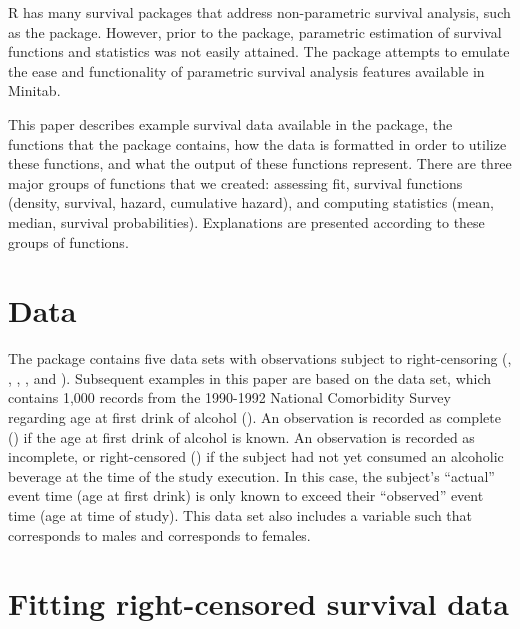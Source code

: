 R has many survival packages that address non-parametric survival
analysis, such as the  package. However, prior to the
 package, parametric estimation of survival functions
and statistics was not easily attained. The  package
attempts to emulate the ease and functionality of parametric survival
analysis features available in Minitab.

This paper describes example survival data available in the
 package, the functions that the package contains, how
the data is formatted in order to utilize these functions, and what the
output of these functions represent. There are three major groups of
functions that we created: assessing fit, survival functions (density,
survival, hazard, cumulative hazard), and computing statistics (mean,
median, survival probabilities). Explanations are presented according to
these groups of functions.

\hypertarget{data}{%
\section{Data}\label{data}}

The  package contains five data sets with observations
subject to right-censoring (, ,
, , and ). Subsequent
examples in this paper are based on the  data set,
which contains 1,000 records from the 1990-1992 National Comorbidity
Survey regarding age at first drink of alcohol (). An
observation is recorded as complete () if the age at
first drink of alcohol is known. An observation is recorded as
incomplete, or right-censored () if the subject had not
yet consumed an alcoholic beverage at the time of the study execution.
In this case, the subject's ``actual'' event time (age at first drink)
is only known to exceed their ``observed'' event time (age at time of
study). This data set also includes a  variable such that
 corresponds to males and  corresponds to females.

\hypertarget{fitting-right-censored-survival-data}{%
\section{Fitting right-censored survival
data}\label{fitting-right-censored-survival-data}}

